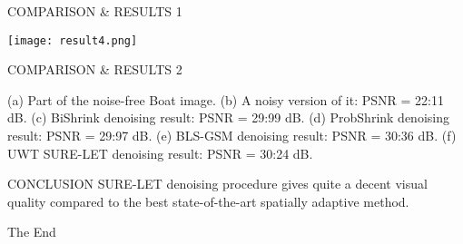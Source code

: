 \documentclass{beamer}
\begin{document}
	
	
	\begin{frame}{COMPARISON \& RESULTS 1}
		\begin{center}
	\texttt{[image: result4.png]}
	\end{center}

		


\end{frame}



	
	
	\begin{frame}{COMPARISON \& RESULTS 2}
	
		(a) Part of the noise-free Boat image. (b) A noisy version of it: PSNR =
	22:11 dB. (c) BiShrink denoising result: PSNR = 29:99 dB. (d) ProbShrink
	denoising result: PSNR = 29:97 dB. (e) BLS-GSM denoising result: PSNR =
	30:36 dB. (f) UWT SURE-LET denoising result: PSNR = 30:24 dB.
	
\end{frame}	
\begin{frame}{CONCLUSION}
SURE-LET denoising procedure gives quite a decent visual quality compared to the best state-of-the-art spatially adaptive method.
\end{frame}

	
	
	
	
	
	
	
	
	
	
	
	
	
	
	
	
	
	
	
	
	
	
	
	
	
	
	
	
	
	\begin{frame}
		\Huge{\centerline{The End}}
	\end{frame}
	
	
\end{document}
